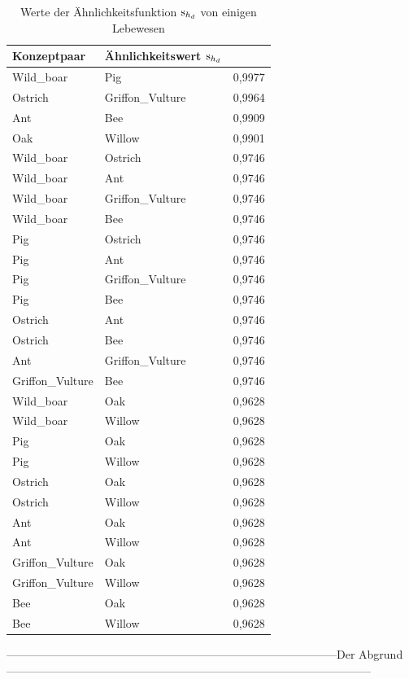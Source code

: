 \begin{table}
\begin{tabular}{lll}
\toprule
Konzeptpaar					&Ähnlichkeitswert $\textnormal{s}_{h_d}$\\
\midrule
Wild\_boar		&Pig		&0,9977\\
Ostrich		&Griffon\_Vulture		&0,9964\\
Ant		&Bee		&0,9909\\
Oak		&Willow		&0,9901\\
Wild\_boar		&Ostrich		&0,9746\\
Wild\_boar		&Ant		&0,9746\\
Wild\_boar		&Griffon\_Vulture		&0,9746\\
Wild\_boar		&Bee		&0,9746\\
Pig		&Ostrich		&0,9746\\
Pig		&Ant		&0,9746\\
Pig		&Griffon\_Vulture		&0,9746\\
Pig		&Bee		&0,9746\\
Ostrich		&Ant		&0,9746\\
Ostrich		&Bee		&0,9746\\
Ant		&Griffon\_Vulture		&0,9746\\
Griffon\_Vulture		&Bee		&0,9746\\
Wild\_boar		&Oak		&0,9628\\
Wild\_boar		&Willow		&0,9628\\
Pig		&Oak		&0,9628\\
Pig		&Willow		&0,9628\\
Ostrich		&Oak		&0,9628\\
Ostrich		&Willow		&0,9628\\
Ant		&Oak		&0,9628\\
Ant		&Willow		&0,9628\\
Griffon\_Vulture		&Oak		&0,9628\\
Griffon\_Vulture		&Willow		&0,9628\\
Bee		&Oak		&0,9628\\
Bee		&Willow		&0,9628\\
\bottomrule
\end{tabular}
\caption{Werte der Ähnlichkeitsfunktion $\textnormal{s}_{h_d}$ von einigen Lebewesen}
\label{tab:aehnlichkeitsmass-semantisch-hierarchie-dbpedia}
\end{table}


\FloatBarrier
\begin{Huge}---------------------------------------------------------------------------------------Der Abgrund------------------------------------------------------------------------------------------------\end{Huge}
